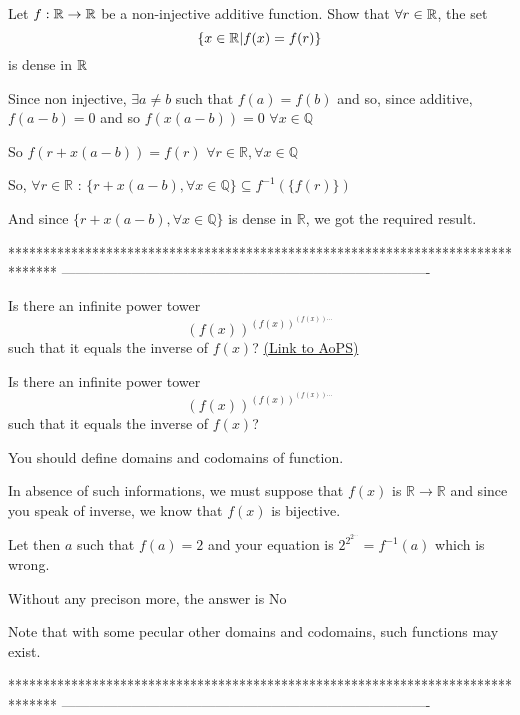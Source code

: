 \begin{solution}
	\begin{tcolorbox}Let $f:\Bbb R\to\Bbb R$ be a non-injective additive function. Show that $\forall r\in\Bbb R$, the set
\[\{x\in\Bbb R|f(x)=f(r)\}\]
is dense in $\Bbb R$\end{tcolorbox}
Since non injective, $\exists a\ne b$ such that $f(a)=f(b)$ and so, since additive, $f(a-b)=0$ and so $f(x(a-b))=0$ $\forall x\in\mathbb Q$

So $f(r+x(a-b))=f(r)$ $\forall r\in\mathbb R,\forall x\in\mathbb Q$

So, $\forall r\in\mathbb R$ :  $\{r+x(a-b),\forall x\in\mathbb Q\}\subseteq f^{-1}(\{f(r)\})$

And since $\{r+x(a-b),\forall x\in\mathbb Q\}$ is dense in $\mathbb R$, we got the required result.
\end{solution}
*******************************************************************************
-------------------------------------------------------------------------------

\begin{problem}
	Is there an infinite power tower \[{ \left( f(x) \right)^{\left( f(x) \right)^{\left( f(x) \right)\cdots}}} \]such that it equals the inverse of $f(x)$?
	\flushright \href{https://artofproblemsolving.com/community/c6h535504}{(Link to AoPS)}
\end{problem}



\begin{solution}
	\begin{tcolorbox}Is there an infinite power tower \[{ \left( f(x) \right)^{\left( f(x) \right)^{\left( f(x) \right)\cdots}}} \]such that it equals the inverse of $f(x)$?\end{tcolorbox}
You should define domains and codomains of function.

In absence of such informations, we must suppose that $f(x)$ is $\mathbb R\to\mathbb R$ and since you speak of inverse, we know that $f(x)$ is bijective.

Let then $a$ such that $f(a)=2$ and your equation is $2^{2^{2^{...}}}=f^{-1}(a)$ which is wrong.

Without any precison more, the answer is $\boxed{\text{No}}$

Note that with some pecular other domains and codomains, such functions may exist.
\end{solution}
*******************************************************************************
-------------------------------------------------------------------------------

